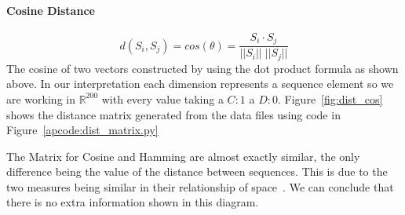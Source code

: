 \paragraph{Cosine Distance}
$$ d(S_i,S_j) = cos(\theta) = \frac{{S_i} \cdot {S_j}}{|| {S_i} || \; || {S_j} ||} $$
The cosine of two vectors constructed by using the dot product formula as shown above.
In our interpretation each dimension represents a sequence element so we are working in $\mathbb{R}^{200}$ with every value taking a $C:1$ a $D:0$.
Figure~\ref{fig:dist_cos} shows the distance matrix generated from the data files using code in Figure~\ref{apcode:dist_matrix.py}

The Matrix for Cosine and Hamming are almost exactly similar, the only difference being the value of the distance between sequences.
This is due to the two measures being similar in their relationship of space~\cite{choi2010survey}.
We can conclude that there is no extra information shown in this diagram. 
